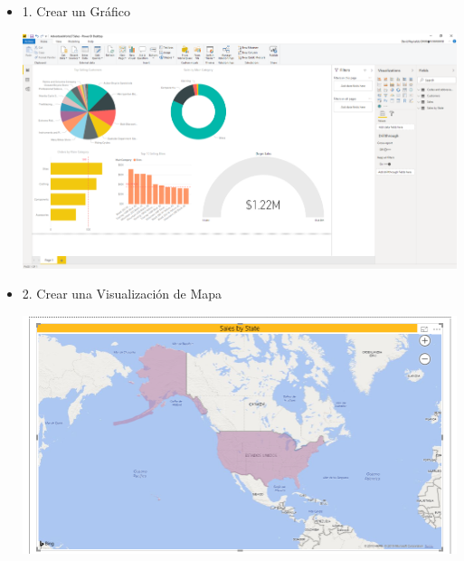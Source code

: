 \begin{itemize}

 \item 1. Crear un Gráfico
	\begin{center}
	\includegraphics[width=18cm]{./Imagenes/I5}
	\end{center}	



 \item 2. Crear una Visualización de Mapa
	\begin{center}
	\includegraphics[width=18cm]{./Imagenes/I6}
	\end{center}	

\end{itemize}
